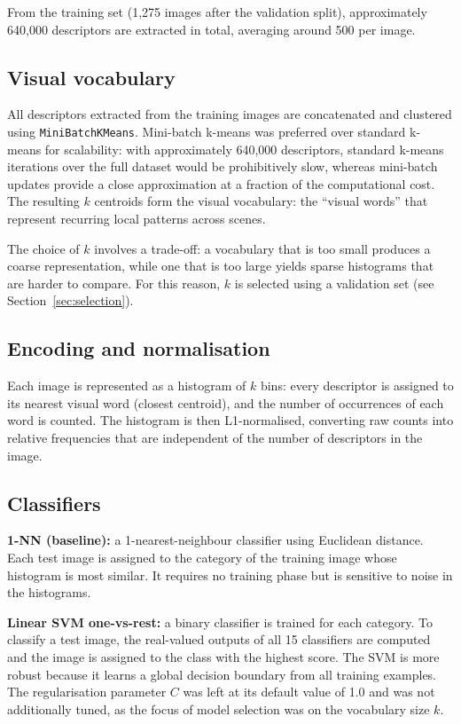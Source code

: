 \documentclass[11pt, a4paper]{article}
\begin{document}
From the training set (1,275 images after the validation split),
approximately 640,000 descriptors are extracted in total, averaging
around 500 per image.

\subsection{Visual vocabulary}

All descriptors extracted from the training images are concatenated and
clustered using \texttt{MiniBatchKMeans}. Mini-batch k-means was
preferred over standard k-means for scalability: with approximately
640,000 descriptors, standard k-means iterations over the full dataset
would be prohibitively slow, whereas mini-batch updates provide a
close approximation at a fraction of the computational cost. The
resulting $k$ centroids form the visual vocabulary: the ``visual
words'' that represent recurring local patterns across scenes.

The choice of $k$ involves a trade-off: a vocabulary that is too small
produces a coarse representation, while one that is too large yields
sparse histograms that are harder to compare. For this reason, $k$ is
selected using a validation set (see Section~\ref{sec:selection}).

\subsection{Encoding and normalisation}

Each image is represented as a histogram of $k$ bins: every descriptor
is assigned to its nearest visual word (closest centroid), and the
number of occurrences of each word is counted. The histogram is then
L1-normalised, converting raw counts into relative frequencies that are
independent of the number of descriptors in the image.

\subsection{Classifiers}

\textbf{1-NN (baseline):} a 1-nearest-neighbour classifier using
Euclidean distance. Each test image is assigned to the category of the
training image whose histogram is most similar. It requires no training
phase but is sensitive to noise in the histograms.

\textbf{Linear SVM one-vs-rest:} a binary classifier is trained for
each category. To classify a test image, the real-valued outputs of all
15 classifiers are computed and the image is assigned to the class with
the highest score. The SVM is more robust because it learns a global
decision boundary from all training examples. The regularisation
parameter $C$ was left at its default value of 1.0 and was not
additionally tuned, as the focus of model selection was on the
vocabulary size $k$.
\end{document}
